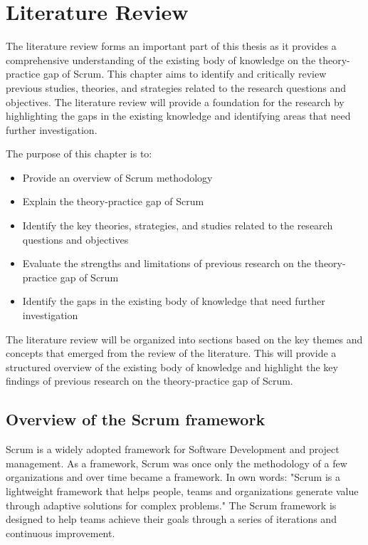 \chapter{Literature Review}\label{cha:LiteratureReview}
The literature review forms an important part of this thesis as it provides a comprehensive understanding of the existing body of knowledge on the theory-practice gap of Scrum. This chapter aims to identify and critically review previous studies, theories, and strategies related to the research questions and objectives. The literature review will provide a foundation for the research by highlighting the gaps in the existing knowledge and identifying areas that need further investigation.

The purpose of this chapter is to:

\begin{itemize}
    \item Provide an overview of Scrum methodology
    \item Explain the theory-practice gap of Scrum
    \item Identify the key theories, strategies, and studies related to the research questions and objectives
    \item Evaluate the strengths and limitations of previous research on the theory-practice gap of Scrum
    \item Identify the gaps in the existing body of knowledge that need further investigation
\end{itemize}

The literature review will be organized into sections based on the key themes and concepts that emerged from the review of the literature. This will provide a structured overview of the existing body of knowledge and highlight the key findings of previous research on the theory-practice gap of Scrum.

\section{Overview of the Scrum framework}\label{sec:OverviewScrumMethodology}
Scrum is a widely adopted \gls{framework} for Software Development and project management. As a \gls{framework}, Scrum was once only the \gls{methodology} of a few organizations and over time became a \gls{framework}. In  own words: "Scrum is a lightweight \gls{framework} that helps people, teams and organizations generate value through adaptive solutions for complex problems." The Scrum \gls{framework} is designed to help teams achieve their goals through a series of iterations and continuous improvement.

